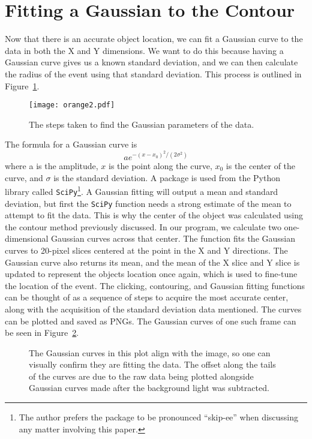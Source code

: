 \section{Fitting a Gaussian to the Contour}
Now that there is an accurate object location, we can fit a Gaussian curve to the data in both the X and Y dimensions. We want to do this because having a Gaussian curve gives us a known standard deviation, and we can then calculate the radius of the event using that standard deviation. This process is outlined in Figure~\ref{fig:gaussianfinder}.

\begin{figure}[h!]
	\centering
	\texttt{[image: orange2.pdf]}
	\caption{The steps taken to find the Gaussian parameters of the data.}
	\label{fig:gaussianfinder}
\end{figure}

The formula for a Gaussian curve is 
\begin{equation}
	ae^{-(x-x_0)^2/(2\sigma^2)}
\end{equation}
where a is the amplitude, $x$ is the point along the curve, $x_0$ is the center of the curve, and $\sigma$ is the standard deviation. A package is used from the Python library called \texttt{SciPy}\footnote{The author prefers the package to be pronounced ``skip-ee'' when discussing any matter involving this paper.}. A Gaussian fitting will output a mean and standard deviation, but first the \texttt{SciPy} function needs a strong estimate of the mean to attempt to fit the data. This is why the center of the object was calculated using the contour method previously discussed. In our program, we calculate two one-dimensional Gaussian curves across that center. The function fits the Gaussian curves to 20-pixel slices centered at the point in the X and Y directions. The Gaussian curve also returns its mean, and the mean of the X slice and Y slice is updated to represent the objects location once again, which is used to fine-tune the location of the event. The clicking, contouring, and Gaussian fitting functions can be thought of as a sequence of steps to acquire the most accurate center, along with the acquisition of the standard deviation data mentioned. The curves can be plotted and saved as PNGs. The Gaussian curves of one such frame can be seen in Figure~\ref{fig:testplot}.

\begin{figure}[h!]
	\centering
	\caption{The Gaussian curves in this plot align with the image, so one can visually confirm they are fitting the data. The offset along the tails of the curves are due to the raw data being plotted alongside Gaussian curves made after the background light was subtracted.}
	\label{fig:testplot}
\end{figure}

